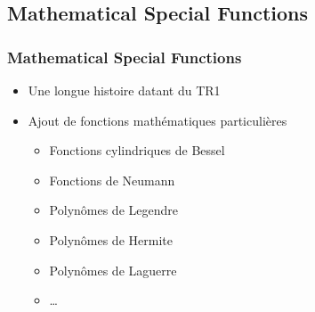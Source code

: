 \documentclass[C++.tex]{subfiles}
\begin{document}
\subsection*{Mathematical Special Functions}
\begin{frame}[fragile]
	\frametitle{Mathematical Special Functions}
	\begin{itemize}
		\item Une longue histoire datant du TR1
		\item Ajout de fonctions mathématiques particulières
		\begin{itemize}
			\item Fonctions cylindriques de Bessel
			\item Fonctions de Neumann
			\item Polynômes de Legendre
			\item Polynômes de Hermite
			\item Polynômes de Laguerre
			\item \ldots{}
		\end{itemize}
	\end{itemize}
\end{frame}
\end{document}
